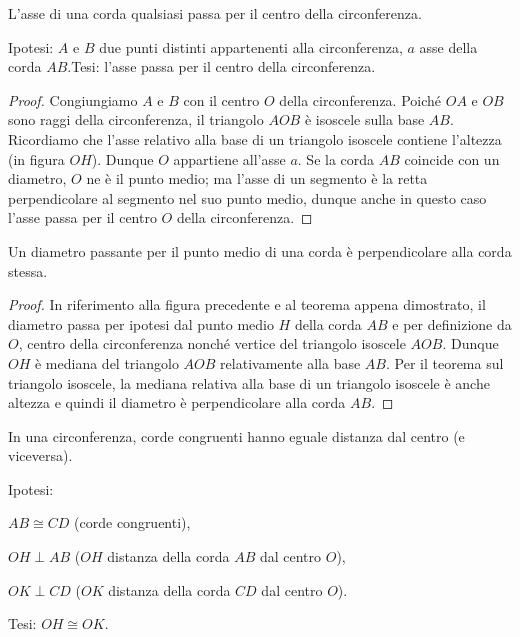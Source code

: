 \begin{teorema}
L'asse di una corda qualsiasi passa per il centro della circonferenza.
\end{teorema}

\noindent Ipotesi: $A$ e $B$ due punti distinti appartenenti alla circonferenza, $a$ asse della corda $AB$.\tab Tesi: l'asse passa per il centro della circonferenza.

\begin{proof}
Congiungiamo $A$ e $B$ con il centro $O$ della circonferenza. Poiché $OA$ e $OB$ sono raggi della circonferenza, il triangolo $AOB$ è isoscele sulla base $AB$. Ricordiamo che l'asse relativo alla base di un triangolo isoscele contiene l'altezza (in figura $OH$).  Dunque $O$ appartiene all'asse $a$.
Se la corda $AB$ coincide con un diametro, $O$ ne è il punto medio; ma l'asse di un segmento è la retta perpendicolare al segmento nel suo punto medio, dunque anche in questo caso l'asse passa per il centro $O$ della circonferenza.
\end{proof}

\begin{teorema}
Un diametro passante per il punto medio di una corda è perpendicolare alla corda stessa.
\end{teorema}

\begin{proof}
In riferimento alla figura precedente e al teorema appena dimostrato, il diametro passa per ipotesi dal punto medio $H$ della corda $AB$ e per definizione da $O$, centro della circonferenza nonché vertice del triangolo isoscele $AOB$. Dunque $OH$ è mediana del triangolo $AOB$ relativamente alla base $AB$. Per il teorema sul triangolo isoscele, la mediana relativa alla base di un triangolo isoscele è anche altezza e quindi il diametro è perpendicolare alla corda $AB$.
\end{proof}

\begin{teorema}
In una circonferenza, corde congruenti hanno eguale distanza dal centro (e viceversa).
\end{teorema}

\noindent Ipotesi:
\begin{itemize*}
\item $AB\cong CD$ (corde congruenti),
\item $OH\perp AB$ ($OH$ distanza della corda $AB$ dal centro $O$),
\item $OK\perp CD$ ($OK$ distanza della corda $CD$ dal centro $O$).
\end{itemize*}
\noindent Tesi: $OH\cong OK$.

